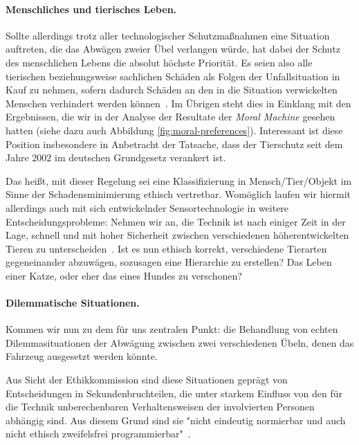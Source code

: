 \documentclass[twocolumn, german]{tum-article}
\begin{document}
\paragraph{Menschliches und tierisches Leben.}
Sollte allerdings trotz aller technologischer Schutzmaßnahmen eine Situation auftreten, die das Abwägen zweier Übel verlangen würde, hat dabei der Schutz des menschlichen Lebens die absolut höchste Priorität.
Es seien also alle tierischen beziehungsweise sachlichen Schäden als Folgen der Unfallsituation in Kauf zu nehmen, sofern dadurch Schäden an den in die Situation verwickelten Menschen verhindert werden können~\cite[S. 11]{ethik-komission}.
Im Übrigen steht dies in Einklang mit den Ergebnissen, die wir in der Analyse der Resultate der \emph{Moral Machine} gesehen hatten (siehe dazu auch Abbildung \vref{fig:moral-preferences}).
Interessant ist diese Position insbesondere in Anbetracht der Tatsache, dass der Tierschutz seit dem Jahre 2002 im deutschen Grundgesetz verankert ist.

Das heißt, mit dieser Regelung sei eine Klassifizierung in Mensch/Tier/Objekt im Sinne der Schadensminimierung ethisch vertretbar.
Womöglich laufen wir hiermit allerdings auch mit sich entwickelnder Sensortechnologie in weitere Entscheidungsprobleme:
Nehmen wir an, die Technik ist nach einiger Zeit in der Lage, schnell und mit hoher Sicherheit zwischen verschiedenen höherentwickelten Tieren zu unterscheiden~\cite[S. 551f.]{ethics-code}.
Ist es nun ethisch korrekt, verschiedene Tierarten gegeneinander abzuwägen, sozusagen eine Hierarchie zu erstellen? Das Leben einer Katze, oder eher das eines Hundes zu verschonen?

\paragraph{Dilemmatische Situationen.}
Kommen wir nun zu dem für uns zentralen Punkt: die Behandlung von echten Dilemmasituationen der Abwägung zwischen zwei verschiedenen Übeln, denen das Fahrzeug ausgesetzt werden könnte.

Aus Sicht der Ethikkommission sind diese Situationen geprägt von Entscheidungen in Sekundenbruchteilen, die unter starkem Einfluss von den für die Technik unberechenbaren Verhaltensweisen der involvierten Personen abhängig sind.
Aus diesem Grund sind sie "nicht eindeutig normierbar und auch nicht ethisch zweifelsfrei programmierbar"~\cite[S. 11]{ethik-komission}.
\end{document}

